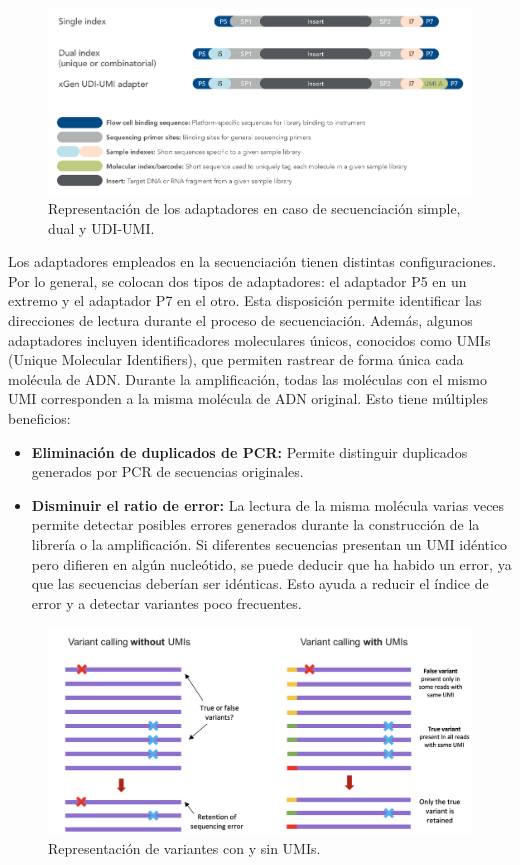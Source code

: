 \begin{itemize}
\begin{figure}[htbp]
\centering
\includegraphics[width = \textwidth]{figs/adaptator.png}
\caption{Representación de los adaptadores en caso de secuenciación simple, dual y UDI-UMI.}
\end{figure}

Los adaptadores empleados en la secuenciación tienen distintas configuraciones. Por lo general, se colocan dos tipos de adaptadores: el adaptador P5 en un extremo y el adaptador P7 en el otro. Esta disposición permite identificar las direcciones de lectura durante el proceso de secuenciación. Además, algunos adaptadores incluyen identificadores moleculares únicos, conocidos como UMIs (Unique Molecular Identifiers), que permiten rastrear de forma única cada molécula de ADN. Durante la amplificación, todas las moléculas con el mismo UMI corresponden a la misma molécula de ADN original. Esto tiene múltiples beneficios:
\begin{itemize}
\item \textbf{Eliminación de duplicados de PCR:} Permite distinguir duplicados generados por PCR de secuencias originales.
\item \textbf{Disminuir el ratio de error:} La lectura de la misma molécula varias veces permite detectar posibles errores generados durante la construcción de la librería o la amplificación. Si diferentes secuencias presentan un UMI idéntico pero difieren en algún nucleótido, se puede deducir que ha habido un error, ya que las secuencias deberían ser idénticas. Esto ayuda a reducir el índice de error y a detectar variantes poco frecuentes.
\end{itemize}

\begin{figure}[htbp]
\centering
\includegraphics[width = \textwidth]{figs/umi-variants.png}
\caption{Representación de variantes con y sin UMIs.}
\end{figure}


\end{itemize}
